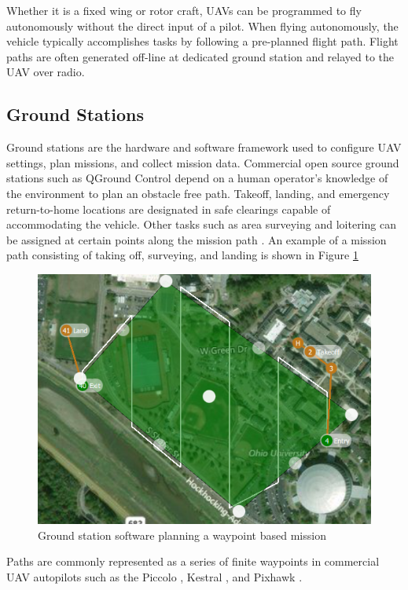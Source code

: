 \documentclass[numbered,pdftex]{ohio-etd}
\begin{document}
Whether it is a fixed wing or rotor craft, UAVs can be programmed to fly autonomously without the direct input of a pilot. When flying autonomously, the vehicle typically accomplishes tasks by following a pre-planned flight path. Flight paths are often generated off-line at dedicated ground station and relayed to the UAV over radio. 

\subsection{Ground Stations}
Ground stations are the hardware and software framework used to configure UAV settings, plan missions, and collect mission data. Commercial open source ground stations such as QGround Control \cite{qgc} depend on a human operator's knowledge of the environment to plan an obstacle free path. Takeoff, landing, and emergency return-to-home locations are designated in safe clearings capable of accommodating the vehicle. Other tasks such as area surveying and loitering can be assigned at certain points along the mission path \cite{wilhelm_direct_2017}. An example of a mission path consisting of taking off, surveying, and landing is shown in Figure \ref{fig:groundstationplanning}




\begin{figure}[H]
	\centering
	\includegraphics[width=12cm]{PaperFigures/Literature/groundStationPlanning}
	\caption{Ground station software planning a waypoint based mission}
	\label{fig:groundstationplanning}
\end{figure}

Paths are commonly represented as a series of finite waypoints in commercial UAV autopilots such as  the Piccolo \cite{piccolo}, Kestral \cite{kestrel}, and Pixhawk \cite{pix}.
\end{document}
